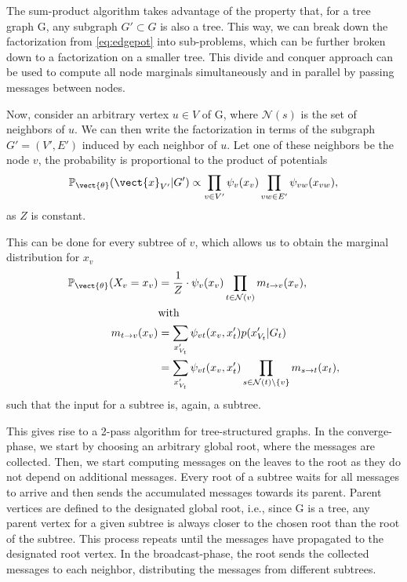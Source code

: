 The sum-product algorithm takes advantage of the property that, for a tree graph G, any subgraph $G' \subset G$ is also a tree. 
This way, we can break down the factorization from \eq\ref{eq:edgepot} into sub-problems, which can be further broken down to a factorization on a smaller tree.
This divide and conquer approach can be used to compute all node marginals simultaneously and in parallel by passing messages between nodes.

Now, consider an arbitrary vertex $u \in V$ of G, where $\mathcal{N}(s)$ is the set of neighbors of $u$.
We can then write the factorization in terms of the subgraph $G'=(V', E')$ induced by each neighbor of $u$. 
Let one of these neighbors be the node $v$, the probability is proportional to the product of potentials
\begin{equation}
    \mathbb{P}_{\vect{\theta}}(\vect{x}_{V'}\lvert G') \propto \prod_{v \in V'} \psi_v(x_v) \prod_{vw \in E'} \psi_{vw}(x_{vw}),
\end{equation}
as $Z$ is constant.

This can be done for every subtree of $v$, which allows us to obtain the marginal distribution for $x_v$
\begin{equation}
    \label{eq:normbp}
    \begin{split}
    \mathbb{P}_{\vect{\theta}}(X_v = x_v) &= \frac{1}{Z} \cdot \psi_v(x_v) \prod_{t \in \mathcal{N}(v)} m_{t \rightarrow v}(x_v),  \\
    & \text{with}\\
    m_{t \rightarrow v}(x_v) &= \sum_{x'_{V_t}} \psi_{vt}(x_v, x_t') p(x'_{V_t} \lvert G_t) \\
    & = \sum_{x'_{V_t}} \psi_{vt}(x_v, x_t')  \prod_{s\in \mathcal{N}(t) \setminus \{v\}} m_{s \rightarrow t}(x_t),
    \end{split}
\end{equation}
such that the input for a subtree is, again, a subtree.

This gives rise to a 2-pass algorithm for tree-structured graphs.
In the converge-phase, we start by choosing an arbitrary global root, where the messages are collected.
Then, we start computing messages on the leaves \wrt to the root as they do not depend on additional messages.
Every root of a subtree waits for all messages to arrive and then sends the accumulated messages towards its parent. 
Parent vertices are defined \wrt to the designated global root, i.e., since G is a tree, any parent vertex for a given subtree is always closer to the chosen root than the root of the subtree.
This process repeats until the messages have propagated to the designated root vertex.
In the broadcast-phase, the root sends the collected messages to each neighbor, distributing the messages from different subtrees.

